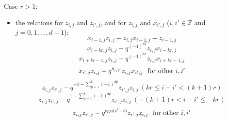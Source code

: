 \documentclass[reqno,12pt,a4paper]{amsart}
\theoremstyle{remark}
\theoremstyle{definition}
\numberwithin{equation}{section}
\begin{document}
\smallskip
\noindent Case $r>1$:
\begin{itemize}
	\item[(1)] the relations for $z_{i,j}$ and $z_{i',j}$, and for $z_{i,j}$ and $x_{i',j}$ ($i,i'\in\mathbb{Z}$ and $j=0,1,\ldots,d-1$):
	\begin{equation}\label{relation:projective-by-simple-and-projective-$r>1$}
		x_{i-1,j}z_{i,j}-z_{i,j}x_{i-1,j}-z_{i-1,j}
	\end{equation}
		\begin{equation*}
		x_{i-kr,j}z_{i,j}-q^{(-1)^{dk}}z_{i,j}x_{i-kr,j} 
	\end{equation*}
	\begin{equation*}
		x_{i+kr-1,j}z_{i,j}-q^{(-1)^{dk}}z_{i,j}x_{i+kr-1,j} 
	\end{equation*}
	\begin{equation*}
		x_{i',j}z_{i,j}-q^{\delta_{i,i'}}z_{i,j}x_{i',j}~\hbox{ for other $i,i'$} 
	\end{equation*}
	\begin{equation*}
		z_{i,j}z_{i',j}-q^{-1-\sum\limits_{p=1}^{k}(-1)^{dp} }z_{i',j}z_{i,j}~  (kr\leq i-i'<(k+1)r)
	\end{equation*}
	\begin{equation*}
		z_{i,j}z_{i',j}-q^{1+\sum\limits_{p=1}^{k}(-1)^{dp} }z_{i',j}z_{i,j}~  (-(k+1)r< i-i'\leq -kr)
	\end{equation*}
	\begin{equation*}
		z_{i,j}z_{i',j}-q^{\operatorname{sgn}(i'-i)}z_{i',j}z_{i,j}~\hbox{ for other $i,i'$}
	\end{equation*}

	

	
	

\end{itemize}
\end{document}

